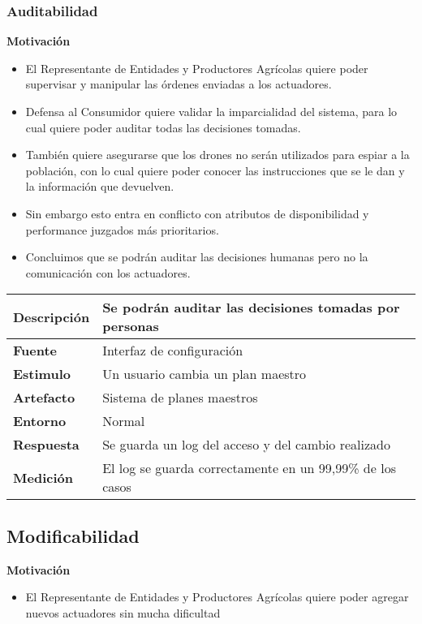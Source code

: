 \subsubsection{Auditabilidad}
\textbf{Motivación}
\begin{itemize}
 \item El Representante de Entidades y Productores Agr\'icolas quiere poder supervisar y manipular las órdenes enviadas a los actuadores.
 \item Defensa al Consumidor quiere validar la imparcialidad del sistema, para lo cual quiere poder auditar todas las decisiones tomadas.
 \item También quiere asegurarse que los drones no serán utilizados para espiar a la población, con lo cual quiere poder conocer las instrucciones que se le dan y la información que devuelven.
 \item Sin embargo esto entra en conflicto con atributos de disponibilidad y performance juzgados más prioritarios.
 \item Concluimos que se podrán auditar las decisiones humanas pero no la comunicación con los actuadores.
\end{itemize}

\begin{tabular}{| l || p{12cm} |}
\hline 
\textbf{Descripci\'on} & Se podrán auditar las decisiones tomadas por personas \\
\hline 
\textbf{Fuente} & Interfaz de configuración \\
\hline 
\textbf{Estimulo} & Un usuario cambia un plan maestro \\
\hline 
\textbf{Artefacto} & Sistema de planes maestros \\
\hline 
\textbf{Entorno} & Normal \\
\hline 
\textbf{Respuesta} & Se guarda un log del acceso y del cambio realizado \\
\hline 
\textbf{Medici\'on} & El log se guarda correctamente en un 99,99\% de los casos \\
\hline 
\end{tabular}


\subsection{Modificabilidad}
\textbf{Motivación}
\begin{itemize}
 \item El Representante de Entidades y Productores Agr\'icolas quiere poder agregar nuevos actuadores sin mucha dificultad
\end{itemize}

